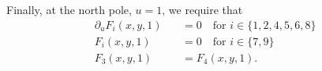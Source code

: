 \documentclass[%
 reprint,
 amsmath,amssymb,
 aps,
]{revtex4-2}
\begin{document}
\noindent Finally, at the north pole, $u=1$, we require that
\begin{eqnarray}
    \partial_u F_i(x,y,1)\, &&=  0 \quad \text{for } i \in \{1,2,4,5,6,8\} \nonumber \\
    F_i(x,y,1)\, &&=  0 \quad \text{for } i \in \{7,9\}\nonumber\\
    F_3(x,y,1)\,&&=F_4(x,y,1).
\end{eqnarray}


\end{document}
